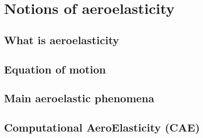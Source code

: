 \chapter{Notions of aeroelasticity}
\label{cha:ael}

\chabstract{}

\minitoc
\newpage

\section{What is aeroelasticity}
\label{sec:what_is_ael}


\section{Equation of motion}
\label{sec:ael_equation}


\section{Main aeroelastic phenomena}
\label{sec:ael_phenomena}


\section{Computational AeroElasticity (CAE)}
\label{sec:ael_cae}


\chconclu{}
